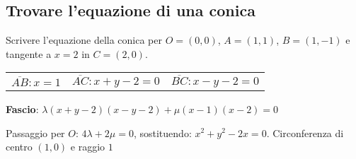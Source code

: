 \subsection{Trovare l'equazione di una conica}

Scrivere l'equazione della conica per $O=(0,0)$, $A=(1,1)$, $B=(1,-1)$ e tangente a $x=2$ in $C=(2,0)$.

\begin{tabular}{lll}
	$\overline{AB}: x = 1$ & $\overline{AC}: x+y-2=0$ & $\overline{BC}: x-y-2=0$
\end{tabular}

\textbf{Fascio}: $\lambda (x+y-2)(x-y-2) + \mu (x-1)(x-2) = 0$

Passaggio per $O$: $4\lambda+2\mu=0$, sostituendo: $x^2+y^2-2x=0$. Circonferenza di centro $(1, 0)$ e raggio $1$